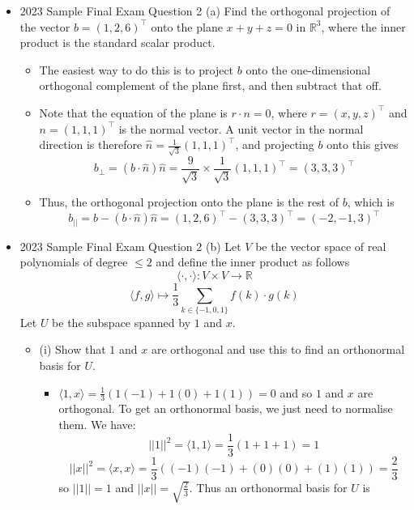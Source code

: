 \documentclass{article}
\begin{document}
\begin{itemize}
\begin{itemize}
    \end{itemize}
    \item 2023 Sample Final Exam Question 2 (a) Find the orthogonal projection of the vector $b = (1,2,6)^\top$ onto the plane $x+y+z = 0$ in $\mathbb{R}^3$, where the inner product is the standard scalar product.
    \begin{itemize}
        \item The easiest way to do this is to project $b$ onto the one-dimensional orthogonal complement of the plane first, and then subtract that off.
        \item Note that the equation of the plane is $r \cdot n = 0$, where $r = (x,y,z)^\top$ and $n = (1,1,1)^\top$ is the normal vector. A unit vector in the normal direction is therefore $\hat{n} = \frac{1}{\sqrt{3}} (1,1,1)^\top$, and projecting $b$ onto this gives
        \[
        b_\perp = (b \cdot \hat{n})\hat{n} = \frac{9}{\sqrt{3}} \times \frac{1}{\sqrt{3}} (1,1,1)^\top = (3,3,3)^\top
        \]
        \item Thus, the orthogonal projection onto the plane is the rest of $b$, which is
        \[
        b_{\vert \vert} = b - (b \cdot \hat{n})\hat{n} = (1,2,6)^\top - (3,3,3)^\top = (-2,-1,3)^\top
        \]
    \end{itemize}
    \item 2023 Sample Final Exam Question 2 (b) Let $V$ be the vector space of real polynomials of degree $\le 2$ and define the inner product as follows
    \[
    \langle \cdot,\cdot \rangle : V \times V \longrightarrow \mathbb{R}
    \]
    \[
    \langle f,g \rangle \longmapsto \frac{1}{3} \sum_{k \in \{-1,0,1\}} f(k) \cdot g(k)
    \]
    Let $U$ be the subspace spanned by $1$ and $x$.
    \begin{itemize}
        \item (i) Show that $1$ and $x$ are orthogonal and use this to find an orthonormal basis for $U$.
        \begin{itemize}
            \item $\langle 1,x \rangle = \frac{1}{3}(1(-1)+1(0)+1(1))=0$ and so $1$ and $x$ are orthogonal. To get an orthonormal basis, we just need to normalise them. We have:
            \[
            \vert \vert 1 \vert \vert^2 = \langle 1,1 \rangle = \frac{1}{3}(1+1+1) = 1
            \]
            \[
            \vert \vert x \vert \vert^2 = \langle x,x \rangle = \frac{1}{3} ((-1)(-1)+(0)(0)+(1)(1)) = \frac{2}{3}
            \]
            so $\vert \vert 1 \vert \vert=1$ and $\vert \vert x \vert \vert = \sqrt{\frac{2}{3}}$. Thus an orthonormal basis for $U$ is

\end{itemize}
\end{itemize}
\end{itemize}
\end{document}
